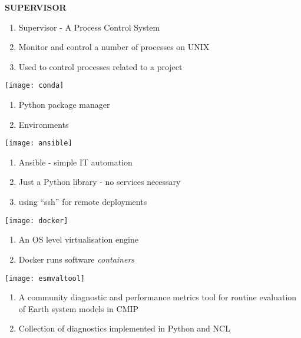 \documentclass[portrait,a0paper,fontscale=0.35]{baposter} %
\newcommand{\compresslist}{%
\setlength{\itemsep}{1pt}%
\setlength{\parskip}{0pt}%
\setlength{\parsep}{0pt}%
}
\begin{document}
\begin{poster}
{\begin{multicols}{2}
    {\bf SUPERVISOR}
    \begin{enumerate}\compresslist
      \item Supervisor - A Process Control System
      \item Monitor and control a number of processes on UNIX
      \item Used to control processes related to a project
    \end{enumerate}

    \texttt{[image: conda]}
    \begin{enumerate}\compresslist
      \item Python package manager
      \item Environments
    \end{enumerate}

    \texttt{[image: ansible]}
    \begin{enumerate}\compresslist
      \item Ansible - simple IT automation
      \item Just a Python library - no services necessary
      \item using ``ssh'' for remote deployments
    \end{enumerate}

    \texttt{[image: docker]}
    \begin{enumerate}\compresslist
      \item An OS level virtualisation engine
      \item Docker runs software \textit{containers}
    \end{enumerate}

    \texttt{[image: esmvaltool]}
    \begin{enumerate}\compresslist
      \item A community diagnostic and performance metrics tool for routine evaluation of Earth system models in CMIP
      \item Collection of diagnostics implemented in Python and NCL
    \end{enumerate}
  \end{multicols}
}




\end{poster}
\end{document}
